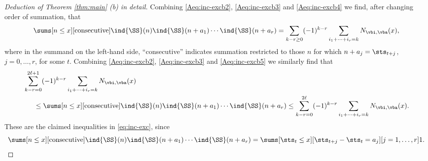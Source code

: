 \documentclass[12pt, reqno, twoside, letterpaper]{amsart}
\begin{document}
\begin{nixnix}
\begin{proof}[Deduction of Theorem \ref{thm:main} (b) in detail]
Combining \eqref{Aeq:inc-excb2}, \eqref{Aeq:inc-excb3} and 
\eqref{Aeq:inc-excb4} we find, after changing order of summation, 
that 
\begin{equation}
 \label{Aeq:inc-excb6}
  \sums[n \le x][\text{consecutive}] 
   \ind{\SS}(n)\ind{\SS}(n + a_1)\cdots \ind{\SS}(n + a_r)
    =
  \sum_{k - r \ge 0} (-1)^{k - r}
   \sum_{i_1 + \cdots + i_r = k} 
    N_{\vbi,\vba}(x),
\end{equation}
where in the summand on the left-hand side, ``consecutive'' 
indicates summation restricted to those $n$ for which 
$n + a_j = \sts_{t + j}$, $j = 0,\ldots,r$, for some $t$.
%
Combining \eqref{Aeq:inc-excb2}, \eqref{Aeq:inc-excb3} and 
\eqref{Aeq:inc-excb5} we similarly find that 
\begin{align}
 \begin{split}
  \label{Aeq:inc-excb7}
 & 
  \sum_{k - r = 0}^{2\ell + 1} (-1)^{k - r}
   \sum_{i_1 + \cdots + i_r = k} 
    N_{\vbi,\vba}(x)
 \\
 & \hspace{15pt} 
  \le 
   \sums[n \le x][\text{consecutive}] 
    \ind{\SS}(n)\ind{\SS}(n + a_1)\cdots \ind{\SS}(n + a_r)
  \le 
   \sum_{k - r = 0}^{2\ell} (-1)^{k - r}
    \sum_{i_1 + \cdots + i_r = k} 
     N_{\vbi,\vba}(x).
 \end{split}
\end{align}
%
These are the claimed inequalities in \eqref{eq:inc-exc}, since 
\[
 \sums[n \le x][\text{consecutive}] 
  \ind{\SS}(n)\ind{\SS}(n + a_1)\cdots \ind{\SS}(n + a_r)
   =
    \sums[\sts_t \le x][\sts_{t + j} - \sts_t = a_j][j = 1,\ldots,r] 1.
\]

\end{proof}
%
\end{nixnix}
%
%
\end{document}
